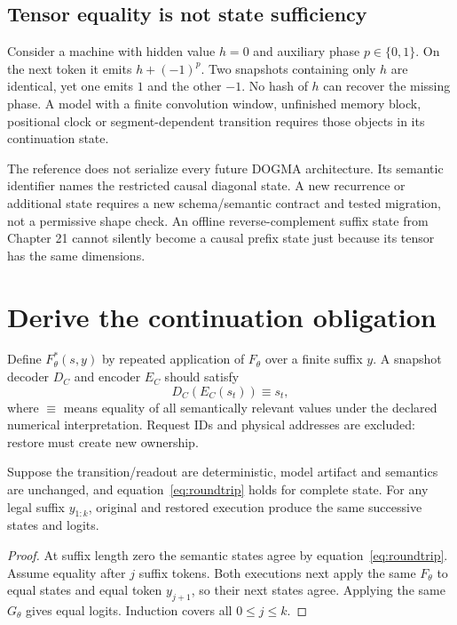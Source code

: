 \subsection{Tensor equality is not state sufficiency}

Consider a machine with hidden value $h=0$ and auxiliary phase
$p\in\{0,1\}$. On the next token it emits $h+(-1)^p$. Two snapshots containing
only $h$ are identical, yet one emits $1$ and the other $-1$. No hash of $h$
can recover the missing phase. A model with a finite convolution window,
unfinished memory block, positional clock or segment-dependent transition
requires those objects in its continuation state.

The reference does not serialize every future DOGMA architecture.
Its semantic identifier names the restricted causal diagonal state.
A new recurrence or additional state requires a new schema/semantic contract
and tested migration, not a permissive shape check. An offline
reverse-complement suffix state from Chapter 21 cannot silently become a causal
prefix state just because its tensor has the same dimensions.

\section{Derive the continuation obligation}

Define $F_\theta^*(s,y)$ by repeated application of $F_\theta$ over a finite
suffix $y$. A snapshot decoder $D_C$ and encoder $E_C$ should satisfy
\begin{equation}
 D_C(E_C(s_t))\equiv s_t,
 \label{eq:roundtrip}
\end{equation}
where $\equiv$ means equality of all semantically relevant values under the
declared numerical interpretation. Request IDs and physical addresses are
excluded: restore must create new ownership.

\begin{proposition}
Suppose the transition/readout are deterministic, model artifact and
semantics are unchanged, and equation~\ref{eq:roundtrip} holds for complete
state. For any legal suffix $y_{1:k}$, original and restored execution produce
the same successive states and logits.
\end{proposition}
\begin{proof}
At suffix length zero the semantic states agree by
equation~\ref{eq:roundtrip}. Assume equality after $j$ suffix tokens.
Both executions next apply the same $F_\theta$ to equal states and equal
token $y_{j+1}$, so their next states agree. Applying the same $G_\theta$
gives equal logits. Induction covers all $0\le j\le k$.
\end{proof}

